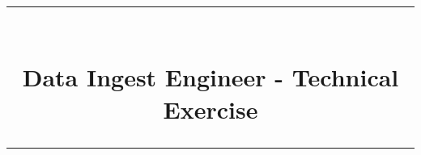 
\usepackage{graphicx}			%
\usepackage{amsmath}			%
\usepackage[margin=1in]{geometry}%
\usepackage{fancyhdr}			%
\usepackage[style=ddmmyyyy]{datetime2}
\usepackage{enumerate}          %
\usepackage[shortlabels]{enumitem}

\pagestyle{fancy}
\fancyhead[r]{\today}
\fancyfoot[c]{\thepage}
\renewcommand{\headrulewidth}{0.2pt} %
\setlength{\headheight}{15pt} %

\newcommand{\horrule}[1]{\rule{\linewidth}{#1}} 	%

\title{
    \vspace{-0.8in} 	%
    \horrule{0.5pt} \\[0.4cm]  %
    \huge Data Ingest Engineer - Technical Exercise \\  %
    \horrule{2pt} \\[0.5cm]  %
}
